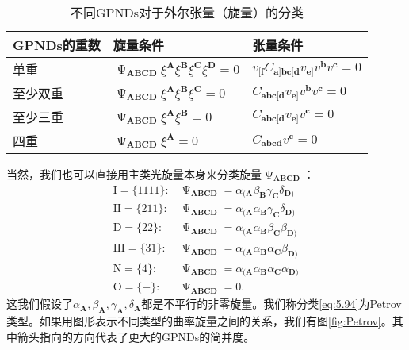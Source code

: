 \begin{table}[h]
	\centering
	\begin{tabularx}{\textwidth}{KKK}
		\toprule 
		GPNDs的重数 & 旋量条件 & 张量条件 \\
		\midrule 
		单重 & $\upPsi _{\boldsymbol{ABCD}} \xi ^{\boldsymbol{A}} \xi ^{\boldsymbol{B}} \xi ^{\boldsymbol{C}} \xi ^{\boldsymbol{D}} =0$ & $v_{[\boldsymbol{f}} C_{\boldsymbol{a}]\boldsymbol{bc}[\boldsymbol{d}} v_{\boldsymbol{e}]} v^{\boldsymbol{b}} v^{\boldsymbol{c}} =0$ \\
		至少双重 & $\upPsi _{\boldsymbol{ABCD}} \xi ^{\boldsymbol{A}} \xi ^{\boldsymbol{B}} \xi ^{\boldsymbol{C}} =0$ & $C_{\boldsymbol{abc}[\boldsymbol{d}} v_{\boldsymbol{e}]} v^{\boldsymbol{b}} v^{\boldsymbol{c}} =0$ \\
		至少三重 & $\upPsi _{\boldsymbol{ABCD}} \xi ^{\boldsymbol{A}} \xi ^{\boldsymbol{B}} =0$ & $C_{\boldsymbol{abc}[\boldsymbol{d}} v_{\boldsymbol{e}]} v^{\boldsymbol{c}} =0$ \\
		四重 & $\upPsi _{\boldsymbol{ABCD}} \xi ^{\boldsymbol{A}} =0$ & $C_{\boldsymbol{abcd}} v^{\boldsymbol{c}} =0$ \\
		\bottomrule
	\end{tabularx}
	\caption{不同GPNDs对于外尔张量（旋量）的分类}
	\label{tab:classification of Weyl tensor}
\end{table}

当然，我们也可以直接用主类光旋量本身来分类旋量$\upPsi _{\boldsymbol{ABCD}}$：
\begin{equation}
	\begin{aligned}
		\text{I} =\{1111\} : & \upPsi _{\boldsymbol{ABCD}} =\alpha _{(\boldsymbol{A}} \beta _{\boldsymbol{B}} \gamma _{\boldsymbol{C}} \delta _{\boldsymbol{D})}\\
		\text{II} =\{211\} : & \upPsi _{\boldsymbol{ABCD}} =\alpha _{(\boldsymbol{A}} \alpha _{\boldsymbol{B}} \gamma _{\boldsymbol{C}} \delta _{\boldsymbol{D})}\\
		\text{D} =\{22\} : & \upPsi _{\boldsymbol{ABCD}} =\alpha _{(\boldsymbol{A}} \alpha _{\boldsymbol{B}} \beta _{\boldsymbol{C}} \beta _{\boldsymbol{D})}\\
		\text{III} =\{31\} : & \upPsi _{\boldsymbol{ABCD}} =\alpha _{(\boldsymbol{A}} \alpha _{\boldsymbol{B}} \alpha _{\boldsymbol{C}} \beta _{\boldsymbol{D})}\\
		\text{N} =\{4\} : & \upPsi _{\boldsymbol{ABCD}} =\alpha _{(\boldsymbol{A}} \alpha _{\boldsymbol{B}} \alpha _{\boldsymbol{C}} \alpha _{\boldsymbol{D})}\\
		\text{O} =\{-\} : & \upPsi _{\boldsymbol{ABCD}} =0.
	\end{aligned}
	\label{eq:5.94}
\end{equation}
这我们假设了$\alpha _{\boldsymbol{A}} ,\beta _{\boldsymbol{A}} ,\gamma _{\boldsymbol{A}} ,\delta _{\boldsymbol{A}}$都是不平行的非零旋量。我们称分类\ref{eq:5.94}为Petrov类型。如果用图形表示不同类型的曲率旋量之间的关系，我们有图\ref{fig:Petrov}。其中箭头指向的方向代表了更大的GPNDs的简并度。

